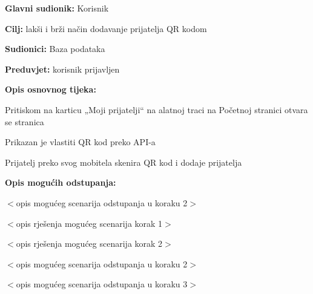 	\noindent {}
\begin{packed_item}
	
	\item \textbf{Glavni sudionik: }Korisnik
	\item  \textbf{Cilj:} lakši i brži način dodavanje prijatelja QR kodom
	\item  \textbf{Sudionici:}
	Baza podataka
	\item  \textbf{Preduvjet:} korisnik prijavljen
	\item  \textbf{Opis osnovnog tijeka:}
	
	\item[] \begin{packed_enum}
		
		\item	Pritiskom na karticu „Moji prijatelji“ na alatnoj traci na Početnoj stranici otvara se stranica
		\item	Prikazan je vlastiti QR kod preko API-a
		\item	Prijatelj preko svog mobitela skenira QR kod i dodaje prijatelja
		
	\end{packed_enum}
	
	\item  \textbf{Opis mogućih odstupanja:}
	
	\item[] \begin{packed_item}
		
		\item[2.a] $<$opis mogućeg scenarija odstupanja u koraku 2$>$
		\item[] \begin{packed_enum}
			
			\item $<$opis rješenja mogućeg scenarija korak 1$>$
			\item $<$opis rješenja mogućeg scenarija korak 2$>$
			
		\end{packed_enum}
		\item[2.b] $<$opis mogućeg scenarija odstupanja u koraku 2$>$
		\item[3.a] $<$opis mogućeg scenarija odstupanja  u koraku 3$>$
		
	\end{packed_item}
\end{packed_item}

